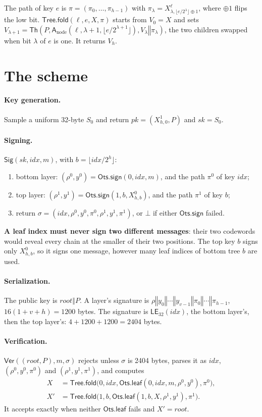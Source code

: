 \documentclass[11pt]{article}
\newcommand{\Th}{\mathsf{Th}}
\newcommand{\Sig}{\mathsf{Sig}}
\newcommand{\Ver}{\mathsf{Ver}}
\newcommand{\OtsSign}{\mathsf{Ots.sign}}
\newcommand{\OtsLeaf}{\mathsf{Ots.leaf}}
\newcommand{\Fold}{\mathsf{Tree.fold}}
\newcommand{\LE}{\mathsf{LE}}
\newcommand{\concat}{\mathbin\Vert}
\newcommand{\idx}{\mathit{idx}}
\newcommand{\pk}{\mathit{pk}}
\newcommand{\sk}{\mathit{sk}}
\newcommand{\rootnode}{\mathit{root}}
\newcommand{\addr}{\mathsf{A}}
\begin{document}
The path of key $e$ is $\pi=(\pi_0,\dots,\pi_{h-1})$ with $\pi_\lambda=X^\ell_{\lambda,\lfloor e/2^\lambda\rfloor\oplus1}$, where $\oplus1$ flips the low bit. $\Fold(\ell,e,X,\pi)$ starts from $V_0=X$ and sets $V_{\lambda+1}=\Th(P,\addr_{\mathrm{node}}(\ell,\lambda+1,\lfloor e/2^{\lambda+1}\rfloor),V_\lambda\concat\pi_\lambda)$, the two children swapped when bit $\lambda$ of $e$ is one. It returns $V_h$.


\section{The scheme}
\label{sec:scheme}

\paragraph{Key generation.} Sample a uniform 32-byte $S_0$ and return $\pk=(X^1_{h,0},P)$ and $\sk=S_0$.

\paragraph{Signing.} $\Sig(\sk,\idx,m)$, with $b=\lfloor\idx/2^h\rfloor$:
\begin{enumerate}
  \item bottom layer: $(\rho^0,y^0)=\OtsSign(0,\idx,m)$, and the path $\pi^0$ of key $\idx$;
  \item top layer: $(\rho^1,y^1)=\OtsSign(1,b,X^0_{h,b})$, and the path $\pi^1$ of key $b$;
  \item return $\sigma=(\idx,\rho^0,y^0,\pi^0,\rho^1,y^1,\pi^1)$, or $\bot$ if either $\OtsSign$ failed.
\end{enumerate}
\textbf{A leaf index must never sign two different messages}: their two codewords would reveal every chain at the smaller of their two positions. The top key $b$ signs only $X^0_{h,b}$, so it signs one message, however many leaf indices of bottom tree $b$ are used.

\paragraph{Serialization.} The public key is $\rootnode\concat P$. A layer's signature is $\rho\concat y_0\concat\cdots\concat y_{v-1}\concat\pi_0\concat\cdots\concat\pi_{h-1}$, $16(1+v+h)=1200$ bytes. The signature is $\LE_{32}(\idx)$, the bottom layer's, then the top layer's: $4+1200+1200=2404$ bytes.

\paragraph{Verification.} $\Ver((\rootnode,P),m,\sigma)$ rejects unless $\sigma$ is 2404 bytes, parses it as $\idx$, $(\rho^0,y^0,\pi^0)$ and $(\rho^1,y^1,\pi^1)$, and computes
\[
\begin{aligned}
  X&=\Fold\bigl(0,\idx,\OtsLeaf(0,\idx,m,\rho^0,y^0),\pi^0\bigr),\\
  X'&=\Fold\bigl(1,b,\OtsLeaf(1,b,X,\rho^1,y^1),\pi^1\bigr).
\end{aligned}
\]
It accepts exactly when neither $\OtsLeaf$ fails and $X'=\rootnode$.
\end{document}
